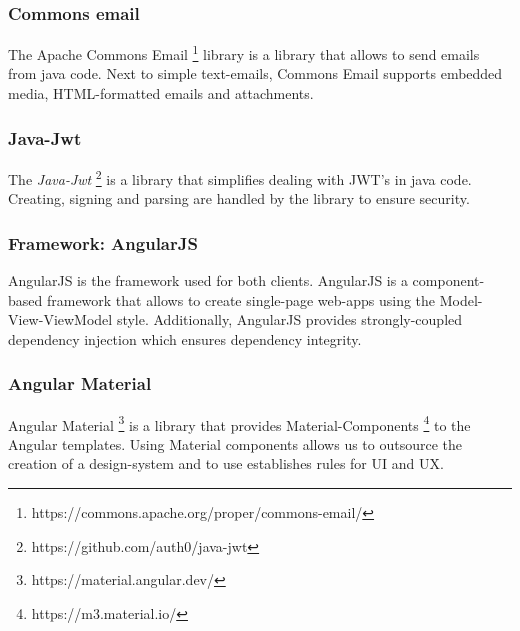 \subsubsection{Commons email}
The Apache Commons Email \footnote{https://commons.apache.org/proper/commons-email/} library is a library that allows to send emails from java code.
Next to simple text-emails, Commons Email supports embedded media, HTML-formatted emails and attachments.

\subsubsection{Java-Jwt}
The \textit{Java-Jwt} \footnote{https://github.com/auth0/java-jwt} is a library that simplifies dealing with JWT's in java code.
Creating, signing and parsing are handled by the library to ensure security.

\subsubsection{Framework: AngularJS}
AngularJS is the framework used for both clients. \newline
AngularJS is a component-based framework that allows to create single-page web-apps using the Model-View-ViewModel style.
Additionally, AngularJS provides strongly-coupled dependency injection which ensures dependency integrity.

\subsubsection{Angular Material}
Angular Material \footnote{https://material.angular.dev/} is a library that provides Material-Components \footnote{https://m3.material.io/} to the Angular templates.
Using Material components allows us to outsource the creation of a design-system and to use establishes rules for UI and UX.